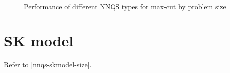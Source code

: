 \begin{figure}[!htb]
    \centering
    \\
    \caption{Performance of different NNQS types for max-cut by problem size}
    \label{nnqs-maxcut-size}
\end{figure}

\section{SK model}
Refer to \autoref{nnqs-skmodel-size}.

